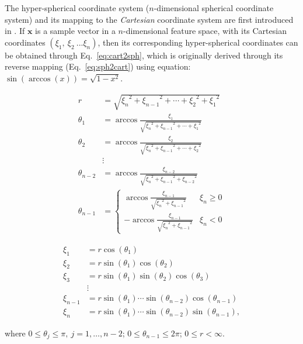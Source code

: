 The hyper-spherical coordinate system ($n$-dimensional spherical coordinate system) and its mapping to the \textit{Cartesian} coordinate system are first introduced in \cite{nsphere}. If $\mathbf{x}$ is a sample vector in 
a $n$-dimensional feature space, with its Cartesian coordinates $(\xi_1,~\xi_2~... \xi_n)$, then its corresponding hyper-spherical coordinates can be obtained through Eq.~\ref{eq:cart2sph}, which is originally derived through its reverse mapping (Eq.~\ref{eq:sph2cart}) using equation: $\sin(\arccos(x)) = \sqrt{1-x^2}$.



\begin{align}
\label{eq:cart2sph}
\nonumber
r      &= \sqrt{{\xi_n}^2 + {\xi_{n-1}}^2 + \cdots + {\xi_2}^2 + {\xi_1}^2} \\
\nonumber
\theta_1 &= \arccos \frac{\xi_{1}}{\sqrt{{\xi_n}^2+{\xi_{n-1}}^2+\cdots+{\xi_1}^2}} \\
\nonumber
 \theta_2 &= \arccos \frac{\xi_{2}}{\sqrt{{\xi_n}^2+{\xi_{n-1}}^2+\cdots+{\xi_2}^2}} \\
\nonumber
        &\vdots\\
\nonumber
 \theta_{n-2} &=\arccos \frac{\xi_{n-2}}{\sqrt{{\xi_n}^2+{\xi_{n-1}}^2+{\xi_{n-2}}^2}} \\
 \theta_{n-1} &= 
 \begin{cases}
     \arccos \frac{\xi_{n-1}}{\sqrt{{\xi_n}^2+{\xi_{n-1}}^2}} & \xi_n\geq 0 \\
     - \arccos \frac{\xi_{n-1}}{\sqrt{{\xi_n}^2+{\xi_{n-1}}^2}} & \xi_n < 0
 \end{cases} 
\end{align}


\begin{align}
\label{eq:sph2cart}
\nonumber
\xi_1 &= r \cos(\theta_1) \\
\nonumber
\xi_2 &= r \sin(\theta_1) \cos(\theta_2) \\
\nonumber
\xi_3 &= r \sin(\theta_1) \sin(\theta_2) \cos(\theta_3) \\
\nonumber
    &\vdots\\
\nonumber
\xi_{n-1} &= r \sin(\theta_1) \cdots \sin(\theta_{n-2}) \cos(\theta_{n-1}) \\
\xi_n &= r \sin(\theta_1) \cdots \sin(\theta_{n-2}) \sin(\theta_{n-1}),
\end{align}


where $0\leq \theta_j\leq\pi,~j=1,\dots ,n-2$; $0\leq \theta_{n-1}\leq 2 \pi$; $0\leq r<\infty$.
 
